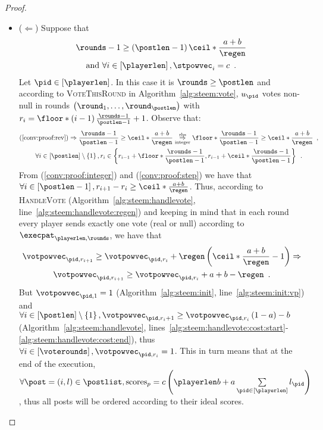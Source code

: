 \begin{proof}
  \begin{itemize}
    \item ($\Leftarrow$) Suppose that
    \begin{gather}
      \label{conv:proof:rev}
      \rounds - 1 \geq \left(\postlen - 1\right)\ceil*{\frac{a+b}{\regen}} \\
      \text{and } \forall i \in \left[\playerlen\right], \stpowvec_i = c
      \enspace. \nonumber
    \end{gather}
    Let $\pid \in \left[\playerlen\right]$. In this case it is $\rounds \geq
    \postlen$ and according to \textsc{VoteThisRound} in
    Algorithm~\ref{alg:steem:vote}, $u_{\pid}$ votes non-null in rounds
    $\left(\round_1, \dots, \round_\postlen\right)$ with $r_i = \floor*{\left(i
    - 1\right)\frac{\rounds - 1}{\postlen - 1}} + 1$. Observe that:
    \begin{gather}
      \label{conv:proof:integer}
      \left(\ref{conv:proof:rev}\right) \Rightarrow \frac{\rounds - 1}{\postlen
      - 1} \geq \ceil*{\frac{a+b}{\regen}}
      \underset{\text{integer}}{\overset{\text{rhs}}{\Rightarrow}}
      \floor*{\frac{\rounds - 1}{\postlen - 1}} \geq \ceil*{\frac{a+b}{\regen}}
      \enspace, \\
      \label{conv:proof:step}
      \forall i \in \left[\postlen\right] \setminus \left\{1\right\}, r_i
      \in \left\{r_{i - 1} + \floor*{\frac{\rounds - 1}{\postlen - 1}}, r_{i -
      1} + \ceil*{\frac{\rounds - 1}{\postlen - 1}}\right\} \enspace.
    \end{gather}
    From (\ref{conv:proof:integer}) and (\ref{conv:proof:step}) we have that
    $\forall i \in \left[\postlen - 1\right], r_{i+1} - r_i \geq
    \ceil*{\frac{a+b}{\regen}}$. Thus, according to \textsc{HandleVote}
    (Algorithm~\ref{alg:steem:handlevote},
    line~\ref{alg:steem:handlevote:regen}) and keeping in mind that in each
    round every player sends exactly one vote (real or null) according to
    $\execpat_{\playerlen, \rounds}$, we have that
    \begin{gather}
      \votpowvec_{\pid, r_{i + 1}} \geq \votpowvec_{\pid, r_i} +
      \regen\left(\ceil*{\frac{a+b}{\regen}} - 1\right) \Rightarrow \nonumber \\
      \label{conv:proof:vp}
      \votpowvec_{\pid, r_{i + 1}} \geq \votpowvec_{\pid, r_i} + a + b - \regen
      \enspace.
    \end{gather}
    But $\votpowvec_{\pid, 1} = 1$ (Algorithm~\ref{alg:steem:init},
    line~\ref{alg:steem:init:vp}) and $\forall i \in \left[\postlen\right]
    \setminus \left\{1\right\}, \votpowvec_{\pid, r_i + 1} \geq
    \votpowvec_{\pid, r_i}\left(1 - a\right) - b$ (Algorithm~\ref{alg:steem:handlevote},
    lines~\ref{alg:steem:handlevote:cost:start}-\ref{alg:steem:handlevote:cost:end}),
    thus $\forall i \in \left[\voterounds\right], \votpowvec_{\pid, r_i} = 1$.
    This in turn means that at the end of the execution, $\forall \post =
    \left(i, l\right) \in \postlist, \mathrm{scores}_{p} = c\left(\playerlen b +
    a \sum\limits_{\pid \in \left[\playerlen\right]} l_{\pid}\right)$, thus all
    posts will be ordered according to their ideal scores.


\end{itemize}
\end{proof}
